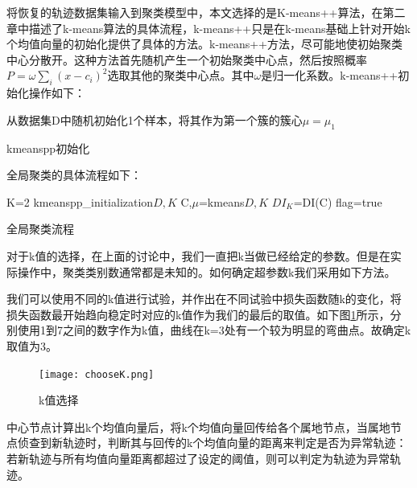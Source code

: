 将恢复的轨迹数据集输入到聚类模型中，本文选择的是K-means++算法，在第二章中描述了k-means算法的具体流程，k-means++只是在k-means基础上针对开始k个均值向量的初始化提供了具体的方法。k-means++方法，尽可能地使初始聚类中心分散开。这种方法首先随机产生一个初始聚类中心点，然后按照概率$P=\omega \sum_i{\left( x-c_i \right) ^2}$选取其他的聚类中心点。其中$\omega$是归一化系数。k-means++初始化操作如下：\\
\begin{algorithm}[H]
	 从数据集D中随机初始化1个样本，将其作为第一个簇的簇心$\mu={\mu_1}$\;
	 \caption{kmeanspp初始化}
\end{algorithm}

全局聚类的具体流程如下：\\
\begin{algorithm}[H]
	 K=2\;
	 kmeanspp\_initialization\(D,K\)\;
	 C,$\mu$=kmeans\(D,K\)\;
	 $DI_K$=DI(C)\;
	 flag=true\;
	 \caption{全局聚类流程}
	\label{kmeanspp}
\end{algorithm}

对于k值的选择，在上面的讨论中，我们一直把k当做已经给定的参数。但是在实际操作中，聚类类别数通常都是未知的。如何确定超参数k我们采用如下方法。

我们可以使用不同的k值进行试验，并作出在不同试验中损失函数随k的变化，将损失函数最开始趋向稳定时对应的k值作为我们的最后的取值。如下图\ref{chooseK}所示，分别使用1到7之间的数字作为k值，曲线在k=3处有一个较为明显的弯曲点。故确定k取值为3。
\begin{figure}[H]
	\texttt{[image: chooseK.png]}
	\caption{k值选择}
	\label{chooseK}
\end{figure}

中心节点计算出k个均值向量后，将k个均值向量回传给各个属地节点，当属地节点侦查到新轨迹时，判断其与回传的k个均值向量的距离来判定是否为异常轨迹：若新轨迹与所有均值向量距离都超过了设定的阈值，则可以判定为轨迹为异常轨迹。


